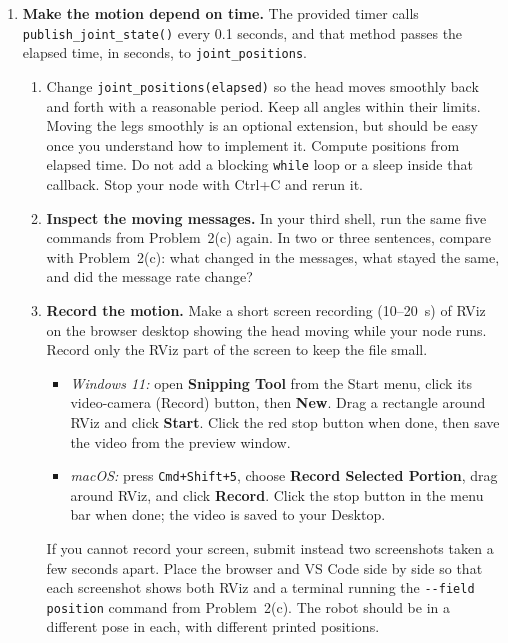 \documentclass[12pt,letterpaper]{article}
\begin{document}
\begin{enumerate}[start=2]
\item \textbf{Make the motion depend on time.}
The provided timer calls \texttt{publish\_joint\_state()} every 0.1 seconds,
and that method passes the elapsed time, in seconds, to
\texttt{joint\_positions}.
\begin{enumerate}
\item Change \texttt{joint\_positions(elapsed)} so the head moves smoothly
back and forth with a reasonable period. Keep all angles
within their limits. Moving the legs smoothly is an optional extension, but should be easy
once you understand how to implement it.
Compute positions from elapsed time.
Do not add a blocking \texttt{while} loop or a sleep inside that callback.
Stop your node with Ctrl+C and rerun it.
\item \textbf{Inspect the moving messages.} In your third shell, run the
same five commands from Problem~2(c) again. In two or three sentences, compare with
Problem~2(c): what changed in the messages, what stayed the same, and did
the message rate change?
\item \textbf{Record the motion.} Make a short screen recording (10--20~s)
of RViz on the browser desktop showing the head moving while your node runs.
Record only the RViz part of the screen to keep the file small.
\begin{itemize}
\item \emph{Windows 11:} open \textbf{Snipping Tool} from the Start menu,
click its video-camera (Record) button, then \textbf{New}. Drag a rectangle
around RViz and click \textbf{Start}. Click the red stop button when done,
then save the video from the preview window.
\item \emph{macOS:} press \texttt{Cmd+Shift+5}, choose \textbf{Record
Selected Portion}, drag around RViz, and click \textbf{Record}. Click the
stop button in the menu bar when done; the video is saved to your Desktop.
\end{itemize}
If you cannot record your screen, submit instead two screenshots taken a few
seconds apart. Place the browser and VS Code side by side so that each
screenshot shows both RViz and a terminal running the
\texttt{-{}-field position} command from Problem~2(c). The robot should be
in a different pose in each, with different printed positions.
\end{enumerate}


\end{enumerate}
\end{document}

